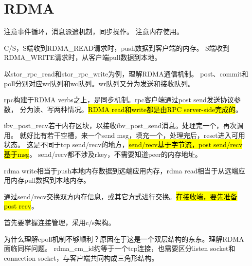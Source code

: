 \chapter{RDMA}

注意事件循环，消息派遣机制，同步操作。
注意内存使用。

C/S，S端收到RDMA\_READ请求时，push数据到客户端的内存。
S端收到RDMA\_WRITE请求时，从客户端pull数据到本地。

以stor\_rpc\_read和stor\_rpc\_write为例，理解RDMA通信机制。
post、commit和poll分别对应wr队列和wc队列。wr队列又分为发送和接收队列。

rpc构建于RDMA verbs之上，是同步机制。rpc客户端通过post send发送协议参数，
分为读、写两种情况。\hl{RDMA read和write都是由RPC server-side完成的}。

ibv\_post\_recv若干内存区块，以接收ibv\_post\_send消息。处理完一个，再次调用。
就好比有若干空槽，来一个send msg，填充一个，处理完后，reset进入可用状态。
这是不同于tcp send/recv的地方，\hl{send/recv基于字节流，post send/recv基于msg}。
send/recv都不涉及rkey，不需要知道peer的内存地址。

rdma write相当于push本地内存数据到远端应用内存，rdma read相当于从远端应用内存pull数据到本地内存。

通过send/recv交换双方内存信息，或其它方式进行交换。\hl{在接收端，要先准备post recv}。

首先要掌握连接管理，采用c/s架构。

为什么理解epoll机制不够顺利？原因在于这是一个双层结构的东东。理解RDMA面临同样问题。
rdma\_cm\_id约等于一个tcp连接，也需要区分listen socket和connection socket，与客户端共同构成三角形结构。
